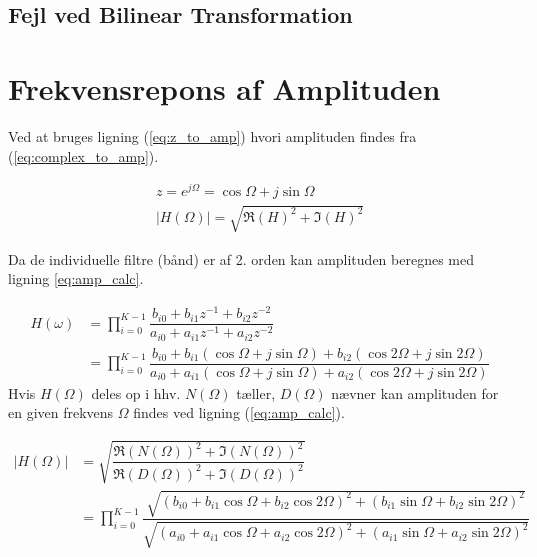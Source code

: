 \subsection{Fejl ved Bilinear Transformation}

\section{Frekvensrepons af Amplituden}

Ved at bruges ligning (\ref{eq:z_to_amp}) hvori amplituden findes fra (\ref{eq:complex_to_amp}).

\begin{align}
    z= e^{j \Omega} = \cos{\Omega} + j \sin{\Omega}  
    \label{eq:z_to_amp}\\
    |H(\Omega)| = \sqrt{ \Re{(H)}^2  + \Im{(H) }^2 }
    \label{eq:complex_to_amp}
\end{align}

Da de individuelle filtre (bånd) er af 2. orden kan amplituden beregnes med ligning \ref{eq:amp_calc}.

\begin{align}
    H(\omega) &= \prod\limits_{i=0}^{K-1} \dfrac{b_{i0} + b_{i1} z^{-1} + b_{i2} z^{-2}}{a_{i0} + a_{i1} z^{-1} + a_{i2} z^{-2}} \nonumber
    \\ &= \prod\limits_{i=0}^{K-1} \dfrac{b_{i0} + b_{i1} \left( \cos{\Omega} + j \sin{\Omega} \right)+b_{i2} \left( \cos{2\Omega} + j \sin{2\Omega} \right)}{a_{i0} + a_{i1} \left( \cos{\Omega} + j \sin{\Omega} \right)+a_{i2} \left( \cos{2\Omega} + j \sin{2\Omega} \right)} \label{eq:amp_rep}
\end{align}
Hvis $H(\Omega)$ deles op i hhv. $N(\Omega)$ tæller, $D(\Omega)$ nævner kan amplituden for en 
given frekvens $\Omega$ findes ved ligning (\ref{eq:amp_calc}).

\begin{align}
    |H(\Omega)| &= \sqrt{ \dfrac{\Re{(N(\Omega))}^2 + \Im{(N(\Omega))}^2 }{\Re{(D(\Omega))}^2 + \Im{(D(\Omega))}^2 }} \nonumber	\\ 
     &= \prod\limits_{i=0}^{K-1} \dfrac{ \sqrt{\left( b_{i0} + b_{i1} \cos{\Omega} + b_{i2} \cos{2 \Omega} \right)^2 +  \left( b_{i1} \sin{\Omega} + b_{i2} \sin{2 \Omega} \right)^2 } }{ \sqrt{\left( a_{i0} + a_{i1} \cos{\Omega} + a_{i2} \cos{2 \Omega} \right)^2 + \left( a_{i1} \sin{\Omega} + a_{i2} \sin{2 \Omega} \right)^2} }
    \label{eq:amp_calc}
\end{align}

